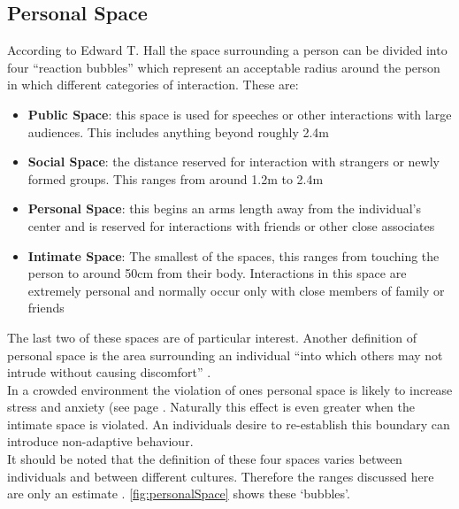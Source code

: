 \subsection{Personal Space}
\label{Res:subsec:personalSpace}
According to Edward T. Hall \cite{HiddenDimension} the space surrounding a person can be divided into four ``reaction bubbles'' which represent an acceptable radius around the person in which different categories of interaction. These are:
\begin{itemize}
  \item{\textbf{Public Space}: this space is used for speeches or other interactions with large audiences. This includes anything beyond roughly 2.4m}
  \item{\textbf{Social Space}: the distance reserved for interaction with strangers or newly formed groups. This ranges from around 1.2m to 2.4m}
  \item{\textbf{Personal Space}: this begins an arms length away from the individual's center and is reserved for interactions with friends or other close associates}
  \item{\textbf{Intimate Space}: The smallest of the spaces, this ranges from touching the person to around 50cm from their body. Interactions in this space are extremely personal and normally occur only with close members of family or friends}
\end{itemize}
The last two of these spaces are of particular interest. Another definition of personal space is the area surrounding an individual ``into which others may not intrude without causing discomfort'' \cite[pg. 424]{HandbookOfPsychology5}.\\
In a crowded environment the violation of ones personal space is likely to increase stress and anxiety (see page \pageref{subsec:personalSpace}. Naturally this effect is even greater when the intimate space is violated. An individuals desire to re-establish this boundary can introduce non-adaptive behaviour.\\
It should be noted that the definition of these four spaces varies between individuals and between different cultures. Therefore the ranges discussed here are only an estimate \cite{ProxemicsWiki}. \ref{fig:personalSpace} shows these `bubbles'.

